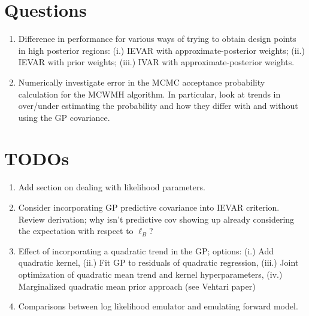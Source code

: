 \documentclass[12pt]{article}
\begin{document}
\section{Questions}
\begin{enumerate} 
\item Difference in performance for various ways of trying to obtain design points in high posterior regions: (i.) IEVAR with approximate-posterior 
weights; (ii.) IEVAR with prior weights; (iii.) IVAR with approximate-posterior weights. 
\item Numerically investigate error in the MCMC acceptance probability calculation for the MCWMH algorithm. In particular, look at trends in over/under 
estimating the probability and how they differ with and without using the GP covariance. 
\end{enumerate}


\section{TODOs}
\begin{enumerate}
\item Add section on dealing with likelihood parameters. 
\item Consider incorporating GP predictive covariance into IEVAR criterion. Review derivation; why isn't predictive cov showing up already considering the 
expectation with respect to $\ell_B$? 
\item Effect of incorporating a quadratic trend in the GP; options: (i.) Add quadratic kernel, (ii.) Fit GP to residuals of quadratic regression, (iii.) Joint optimization 
of quadratic mean trend and kernel hyperparameters, (iv.) Marginalized quadratic mean prior approach (see Vehtari paper) 
\item Comparisons between log likelihood emulator and emulating forward model. 
\end{enumerate}

 

\end{document}
